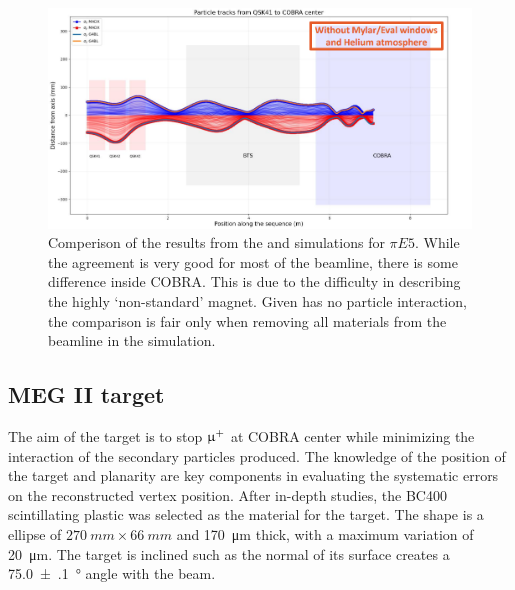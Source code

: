 \begin{refsection}
        \begin{figure}
            \centering
            \includegraphics[width = \textwidth]{Figures/MEG/madx_vs_g4b.png}
            \caption[$\pi E5$: \madx simulation]{Comperison of the results from the \gfb and \madx simulations for $\pi E5$. While the agreement is very good for most of the beamline, there is some difference inside COBRA. This is due to the difficulty in describing the highly `non-standard' magnet. Given \madx has no particle interaction, the comparison is fair only when removing all materials from the beamline in the \gfb simulation.}
            \label{fig:madx_vs_g4b}
        \end{figure}

    \subsection{MEG II target}
    \label{sec:MEG:target}
        The aim of the target is to stop $\upmu^+$ at COBRA center while minimizing the interaction of the secondary particles produced.
        The knowledge of the position of the target and planarity are key components in evaluating the systematic errors on the reconstructed vertex position. 
        After in-depth studies, the BC400 scintillating plastic was selected as the material for the target.
        The shape is a ellipse of $\SI{270}{mm}\times\SI{66}{mm}$ and \SI{170}{\micro m} thick, with a maximum variation of \SI{20}{\micro m}. 
        The target is inclined such as the normal of its surface creates a \SI{75.0(1)}{\degree} angle with the beam. 
        

\end{refsection}
